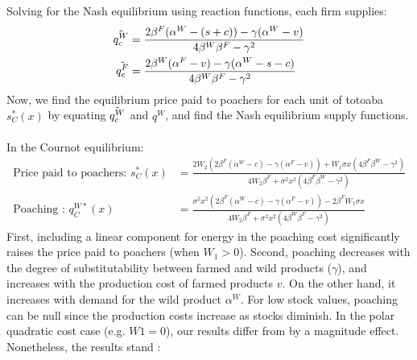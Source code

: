 Solving for the Nash equilibrium using reaction functions, each firm supplies: 
\begin{align}
    \Tilde{q^W_c} &= \frac{2\beta^F(\alpha^W - (s+c)) - \gamma(\alpha^W - v)}{4\beta^W\beta^F - \gamma^2}\\
    \Tilde{q^F_c}&= \frac{2\beta^W(\alpha^F-v)-\gamma(\alpha^W - s -c)}{4\beta^W\beta^F-\gamma^2}
\end{align}
Now, we find the equilibrium price paid to poachers for each unit of totoaba $s^{*}_C(x)$ by equating $\Tilde{q^W_c}$ and $q^W$, and find the Nash equilibrium supply functions. 
\\\\
In the Cournot equilibrium:
\begin{align}
    \text{Price paid to poachers: } s_C^*(x) &= \frac{2 W_2(2\beta^F(\alpha^W - c) - \gamma(\alpha^F - v)) + W_1 \sigma x(4\beta^F\beta^W - \gamma^2)}{4W_2 \beta^F + \sigma^2 x^2(4\beta^F\beta^W -\gamma^2)} \label{eq:price_poachers_cournot}\\
    \text{Poaching : } q^{W*}_C(x) &= \frac{\sigma^2 x^2(2\beta^F(\alpha^W -c) - \gamma(\alpha^F - v)) - 2\beta^F W_1 \sigma x}{4 W_2 \beta^F + \sigma^2 x^2(4\beta^W \beta^F - \gamma^2)}
    \label{eq:poaching_cournot}
\end{align}
First, including a linear component for energy in the poaching cost significantly raises the price paid to poachers (when $W_1>0$).
Second, poaching decreases with the degree of substitutability between farmed and wild products ($\gamma$), and increases with the production cost of farmed products $v$. On the other hand, it increases with demand for the wild product $\alpha^W$.
For low stock values, poaching can be null since the production costs increase as stocks diminish. In the polar quadratic cost case (e.g. $W1 = 0$), our results differ from \cite{damania_economics_2007} by a magnitude effect. Nonetheless, the results stand : 
